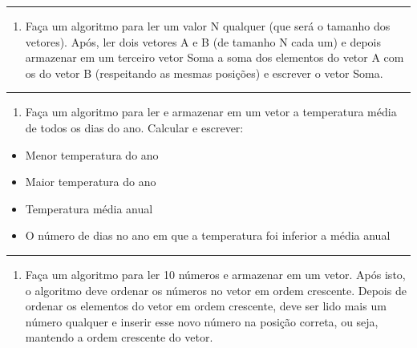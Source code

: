 \documentclass[12pt,a4paper]{article}
\renewcommand{\linethickness}{0.05em}
\providecommand{\tightlist}{%
      \setlength{\itemsep}{0pt}\setlength{\parskip}{0pt}}
\begin{document}
    \begin{center}\rule{0.5\linewidth}{\linethickness}\end{center}

\begin{enumerate}
\def\labelenumi{\arabic{enumi}.}
\setcounter{enumi}{7}
\tightlist
\item
  Faça um algoritmo para ler um valor N qualquer (que será o tamanho dos
  vetores). Após, ler dois vetores A e B (de tamanho N cada um) e depois
  armazenar em um terceiro vetor Soma a soma dos elementos do vetor A
  com os do vetor B (respeitando as mesmas posições) e escrever o vetor
  Soma.
\end{enumerate}

    \begin{center}\rule{0.5\linewidth}{\linethickness}\end{center}

\begin{enumerate}
\def\labelenumi{\arabic{enumi}.}
\setcounter{enumi}{8}
\tightlist
\item
  Faça um algoritmo para ler e armazenar em um vetor a temperatura média
  de todos os dias do ano. Calcular e escrever:
\end{enumerate}

\begin{itemize}
\tightlist
\item
  Menor temperatura do ano
\item
  Maior temperatura do ano
\item
  Temperatura média anual
\item
  O número de dias no ano em que a temperatura foi inferior a média
  anual
\end{itemize}

    \begin{center}\rule{0.5\linewidth}{\linethickness}\end{center}

\begin{enumerate}
\def\labelenumi{\arabic{enumi}.}
\setcounter{enumi}{9}
\tightlist
\item
  Faça um algoritmo para ler 10 números e armazenar em um vetor. Após
  isto, o algoritmo deve ordenar os números no vetor em ordem crescente.
  Depois de ordenar os elementos do vetor em ordem crescente, deve ser
  lido mais um número qualquer e inserir esse novo número na posição
  correta, ou seja, mantendo a ordem crescente do vetor.
\end{enumerate}
\end{document}
